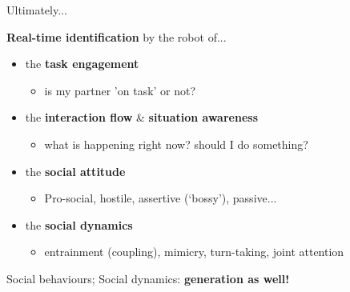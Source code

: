 \documentclass[compress]{beamer}
\begin{document}
\begin{frame}{Ultimately...}

    {\bf Real-time identification} by the robot of...

    \begin{itemize}
        \item<+-> the \textbf{task engagement}
            \begin{itemize}
                \item is my partner 'on task' or not?
            \end{itemize}
        \item<+-> the \textbf{interaction flow} \& \textbf{situation awareness}
            \begin{itemize}
                \item what is happening right now? should I do something?
            \end{itemize}
        \item<+-> the \textbf{social attitude}
            \begin{itemize}
                \item Pro-social, hostile, assertive (‘bossy’), passive...
            \end{itemize}
        \item<+-> the \textbf{social dynamics}
            \begin{itemize}
                \item entrainment (coupling), mimicry, turn-taking, joint
                    attention
            \end{itemize}
    \end{itemize}

    \pause

    Social behaviours; Social dynamics: \textbf{generation as well!}
\end{frame}


%
%
%
%

\end{document}
